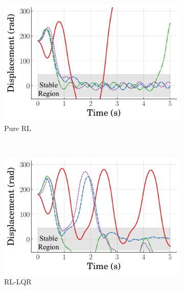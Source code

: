 %
\begin{figure}[tb]
    \centering
    \begin{subfigure}[b]{0.49\textwidth}
        \centering
        \includegraphics[width=\textwidth]{figures/figures_robustness/invpend_robustness/Angular_displacement_DELAY_2_pure_RL.pdf}
        \caption{Pure RL}
        \label{subfig_chap4:invpend_delay_pure_RL}
    \end{subfigure}\\
    \hfill
    \begin{subfigure}[b]{0.49\textwidth}
        \centering
        \includegraphics[width=\textwidth]{figures/figures_robustness/invpend_robustness/Angular_displacement_DELAY_2_lumped_LQR.pdf}
        \caption{RL-LQR}
        \label{subfig_chap4:invpend_delay_RL_LQR}
    \end{subfigure}
    \hfill
    \begin{subfigure}[b]{0.49\textwidth}

\end{subfigure}
\end{figure}

